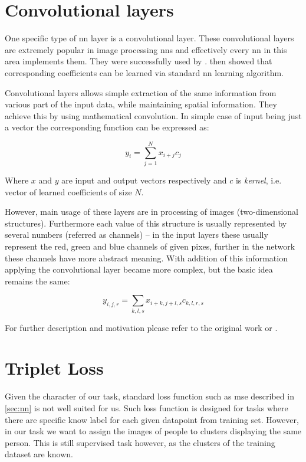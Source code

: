 \section{Convolutional layers}
\label{sec:conv}

One specific type of \gls{nn} layer is a convolutional layer. These convolutional layers
are extremely popular in image processing \glspl{nn} and effectively every
\gls{nn} in this area implements them. They were successfully used by
\cite{conv}. \cite{convbackprop} then showed that corresponding coefficients
can be learned via standard \gls{nn} learning algorithm.

Convolutional layers allows simple extraction of the same information from
various part of the input data, while maintaining spatial information. They
achieve this by using mathematical convolution. In simple case of input being
just a vector the corresponding function can be expressed as:

$$y_i = \sum_{j=1}^N x_{i+j} c_j$$

Where $x$ and $y$ are input and output vectors respectively and $c$ is
\emph{kernel}, i.e. vector of learned coefficients of size $N$.

However, main usage of these layers are in processing of images
(two-dimensional structures). Furthermore each value of this structure
is usually represented by several numbers (referred as channels) -- in the
input layers these usually represent the red, green and blue channels of
given pixes, further in the network these channels have more abstract
meaning. With addition of this information applying the convolutional
layer became more complex, but the basic idea remains the same:

$$y_{i, j, r} = \sum_{k, l, s} x_{i+k, j+l, s} c_{k, l, r, s}$$

For further description and motivation please refer to the original work
or \cite{deeplearningbook}.

\section{Triplet Loss}

Given the character of our task, standard loss function such as \gls{mse}
described in \autoref{sec:nn} is not well suited for us. Such loss function
is designed for tasks where there are specific know label for each given
datapoint from training set. However, in our task we want to assign the
images of people to clusters displaying the same person. This is still
supervised task however, as the clusters of the training dataset are known.

